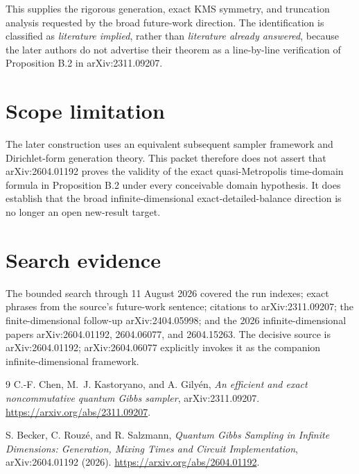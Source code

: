 \documentclass[11pt]{article}
\begin{document}
This supplies the rigorous generation, exact KMS symmetry, and truncation
analysis requested by the broad future-work direction.  The identification is
classified as \emph{literature implied}, rather than
\emph{literature already answered}, because the later authors do not advertise
their theorem as a line-by-line verification of Proposition B.2 in
arXiv:2311.09207.

\section{Scope limitation}

The later construction uses an equivalent subsequent sampler framework and
Dirichlet-form generation theory.  This packet therefore does not assert that
arXiv:2604.01192 proves the validity of the exact quasi-Metropolis time-domain
formula in Proposition B.2 under every conceivable domain hypothesis.  It
does establish that the broad infinite-dimensional exact-detailed-balance
direction is no longer an open new-result target.

\section{Search evidence}

The bounded search through 11 August 2026 covered the run indexes; exact
phrases from the source's future-work sentence; citations to arXiv:2311.09207;
the finite-dimensional follow-up arXiv:2404.05998; and the 2026
infinite-dimensional papers arXiv:2604.01192, 2604.06077, and 2604.15263.  The
decisive source is arXiv:2604.01192; arXiv:2604.06077 explicitly invokes it as
the companion infinite-dimensional framework.

\begin{thebibliography}{9}
C.-F. Chen, M.~J. Kastoryano, and A. Gily\'en,
\emph{An efficient and exact noncommutative quantum Gibbs sampler},
arXiv:2311.09207.
\url{https://arxiv.org/abs/2311.09207}.

S. Becker, C. Rouz\'e, and R. Salzmann,
\emph{Quantum Gibbs Sampling in Infinite Dimensions: Generation, Mixing Times
and Circuit Implementation}, arXiv:2604.01192 (2026).
\url{https://arxiv.org/abs/2604.01192}.
\end{thebibliography}
\end{document}
